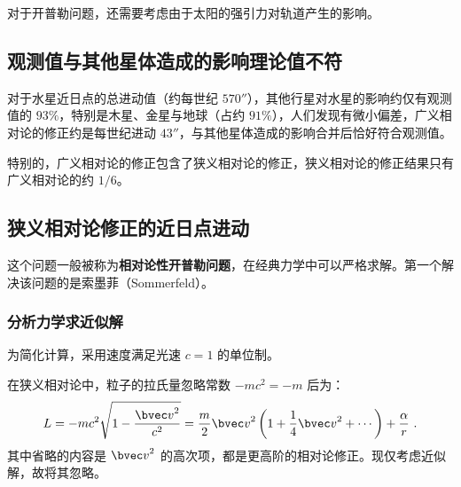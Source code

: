 



对于开普勒问题，还需要考虑由于太阳的强引力对轨道产生的影响。

\subsection{观测值与其他星体造成的影响理论值不符}
对于水星近日点的总进动值（约每世纪 $570''$），其他行星对水星的影响约仅有观测值的 $93 \%$，特别是木星、金星与地球（占约 $91\%$），人们发现有微小偏差，广义相对论的修正约是每世纪进动 $43''$，与其他星体造成的影响合并后恰好符合观测值。

特别的，广义相对论的修正包含了狭义相对论的修正，狭义相对论的修正结果只有广义相对论的约 $1/6$。

\subsection{狭义相对论修正的近日点进动}
这个问题一般被称为\textbf{相对论性开普勒问题}，在经典力学中可以严格求解。第一个解决该问题的是索墨菲（Sommerfeld）。

\subsubsection{分析力学求近似解}
为简化计算，采用速度满足光速 $c=1$ 的单位制。

在狭义相对论中，粒子的拉氏量忽略常数 $-mc^2 = -m$ 后为：
$$L = -mc^2 \sqrt{1- \frac{{\bvec v}^2}{c^2}} = \frac{m}{2} {\bvec v}^2 \left( 1+\frac{1}{4} {\bvec v}^2 + \cdots \right) + \frac{\alpha}{r} ~.$$
其中省略的内容是 ${\bvec v}^2$ 的高次项，都是更高阶的相对论修正。现仅考虑近似解，故将其忽略。


